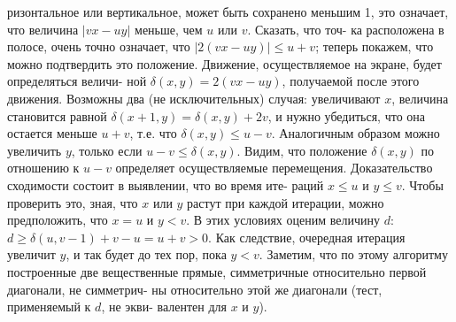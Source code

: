 \noindent
ризонтальное или вертикальное, может быть сохранено меньшим 1, это\linebreak
означает, что величина $|vx-uy|$ меньше, чем $u$ или $v$. Сказать, что точ-\linebreak
ка расположена в полосе, очень точно означает, что $|2(vx-uy)|\leqslant u+v$;\linebreak
теперь покажем, что можно подтвердить это положение.\newline
\hspace*{15pt}Движение, осуществляемое на экране, будет определяться величи-\linebreak
ной $\delta(x,y)=2(vx-uy)$, получаемой после этого движения. Возможны\linebreak
два (не исключительных) случая: увеличивают $x$, величина становится\linebreak
равной $\delta(x+1,y)=\delta(x,y)+2v$, и нужно убедиться, что она остается\linebreak
меньше $u+v$, т.е. что $\delta(x,y)\leqslant u-v$. Аналогичным образом можно\linebreak
увеличить $y$, только если $u-v\leqslant\delta(x,y)$. Видим, что положение $\delta(x,y)$\linebreak
по отношению к $u-v$ определяет осуществляемые перемещения.\newline
\hspace*{15pt}Доказательство сходимости состоит в выявлении, что во время ите-\linebreak
раций $x\leqslant u$ и $y\leqslant v$. Чтобы проверить это, зная, что $x$ или $y$ растут\linebreak
при каждой итерации, можно предположить, что $x=u$ и $y<v$. В\linebreak
этих условиях оценим величину $d$: $d\geqslant\delta(u,v-1)+v-u=u+v>0$.\linebreak
Как следствие, очередная итерация увеличит $y$, и так будет до тех пор,\linebreak
пока $y<v$.\newline
\hspace*{15pt}Заметим, что по этому алгоритму построенные две вещественные\linebreak
прямые, симметричные относительно первой диагонали, не симметрич-\linebreak
ны относительно этой же диагонали (тест, применяемый к $d$, не экви-\linebreak
валентен для $x$ и $y$).\\

